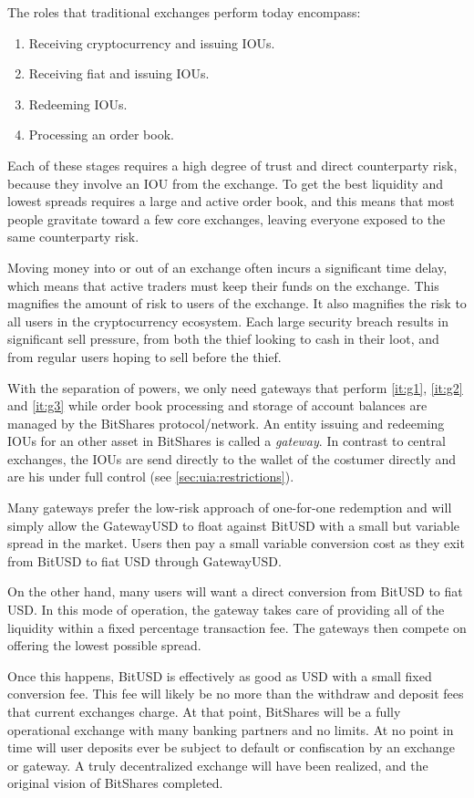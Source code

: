 \label{sec:gateway}

The roles that traditional exchanges perform today encompass:

\begin{enumerate}
 \item \label{it:g1} Receiving cryptocurrency and issuing IOUs.
 \item \label{it:g2} Receiving fiat and issuing IOUs.
 \item \label{it:g3} Redeeming IOUs.
 \item \label{it:g4} Processing an order book.
\end{enumerate}

Each of these stages requires a high degree of trust and direct counterparty
risk, because they involve an IOU from the exchange. To get the best
liquidity and lowest spreads requires a large and active order book, and this
means that most people gravitate toward a few core exchanges, leaving everyone
exposed to the same counterparty risk.

Moving money into or out of an exchange often incurs a significant time delay,
which means that active traders must keep their funds on the exchange. This
magnifies the amount of risk to users of the exchange. It also magnifies the
risk to all users in the cryptocurrency ecosystem. Each large security breach
results in significant sell pressure, from both the thief looking to cash in
their loot, and from regular users hoping to sell before the thief.

\medskip

With the separation of powers, we only need gateways that perform
\cref{it:g1}, \cref{it:g2} and \cref{it:g3} while order book processing and
storage of account balances are managed by the BitShares protocol/network. An
entity issuing and redeeming IOUs for an other asset in BitShares is called a
\emph{gateway}. In contrast to central exchanges, the IOUs are send directly
to the wallet of the costumer directly and are his under full control (see
\cref{sec:uia:restrictions}).

Many gateways prefer the low-risk approach of one-for-one redemption and will
simply allow the GatewayUSD to float against BitUSD with a small but variable
spread in the market. Users then pay a small variable conversion cost as they
exit from BitUSD to fiat USD through GatewayUSD.

On the other hand, many users will want a direct conversion from BitUSD to fiat
USD. In this mode of operation, the gateway takes care of providing all of the
liquidity within a fixed percentage transaction fee. The gateways then
compete on offering the lowest possible spread.

Once this happens, BitUSD is effectively as good as USD with a small fixed
conversion fee. This fee will likely be no more than the withdraw and deposit
fees that current exchanges charge. At that point, BitShares will be a fully
operational exchange with many banking partners and no limits. At no point in
time will user deposits ever be subject to default or confiscation by an
exchange or gateway. A truly decentralized exchange will have been realized,
and the original vision of BitShares completed.

